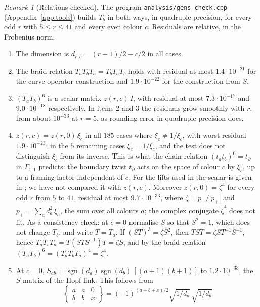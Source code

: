 \documentclass[11pt]{amsart}
\theoremstyle{definition}
\theoremstyle{remark}
\newtheorem{remark}[conjecture]{Remark}
\begin{document}
\begin{remark}[Relations checked]\label{rem:relations}
The program \texttt{analysis/gens\_check.cpp} (Appendix~\ref{app:tools}) builds
$T_b$ in both ways, in quadruple precision, for every odd $r$ with $5 \le r \le 41$
and every even colour $c$. Residuals are relative, in the Frobenius norm.
\begin{enumerate}
\item The dimension is $d_{r,c} = (r-1)/2 - c/2$ in all cases.
\item The braid relation $T_aT_bT_a = T_bT_aT_b$ holds with residual at most
$1.4 \cdot 10^{-21}$ for the curve operator construction and $1.9 \cdot 10^{-22}$ for
the construction from $S$.
\item $(T_aT_b)^6$ is a scalar matrix $z(r,c)\,I$, with residual at most
$7.3 \cdot 10^{-17}$ and $9.0 \cdot 10^{-18}$ respectively. In items 2 and 3 the
residuals grow smoothly with $r$, from about $10^{-33}$ at $r = 5$, as rounding error
in quadruple precision does.
\item $z(r,c) = z(r,0)\,\xi_c$ in all $185$ cases where $\xi_c \ne 1/\xi_c$, with
worst residual $1.9 \cdot 10^{-23}$; in the $5$ remaining cases $\xi_c = 1/\xi_c$,
and the test does not distinguish $\xi_c$ from its inverse. This is what the chain
relation $(t_at_b)^6 = t_\partial$ in $\Gamma_{1,1}$ \cite[Section~1, (2)]{GM}
predicts: the boundary twist $t_\partial$ acts on the space of colour $c$ by $\xi_c$,
up to a framing factor independent of $c$. For the lifts used in \cite{GM} the
scalar is given in \cite[Remark~4.5, (9)]{GM}; we have not compared it with
$z(r,c)$. Moreover $z(r,0) = \zeta^4$ for every odd $r$ from $5$ to $41$, residual at
most $9.7 \cdot 10^{-33}$, where
$\zeta = p_+/|p_+|$ and $p_+ = \sum_a d_a^2\,\xi_a$, the sum over all colours $a$;
the complex conjugate $\bar\zeta^4$ does not fit. As a consistency check: at $c = 0$
normalise $S$ so that $S^2 = 1$, which does not change $T_b$, and write $T = T_a$.
If $(ST)^3 = \zeta S^2$, then $TST = \zeta S T^{-1} S^{-1}$, hence
$T_aT_bT_a = T(STS^{-1})T = \zeta S$, and by the braid relation
$(T_aT_b)^6 = (T_aT_bT_a)^4 = \zeta^4$.
\item At $c = 0$, $S_{ab} = \operatorname{sgn}(d_a)\operatorname{sgn}(d_b)\,[(a+1)(b+1)]$
to $1.2 \cdot 10^{-33}$, the $S$-matrix of the Hopf link. This follows from
\[
\begin{Bmatrix} a & a & 0 \\ b & b & x \end{Bmatrix}
= (-1)^{(a+b+x)/2} \sqrt{1/d_a}\,\sqrt{1/d_b}
\]
\end{enumerate}
\end{remark}
\end{document}
